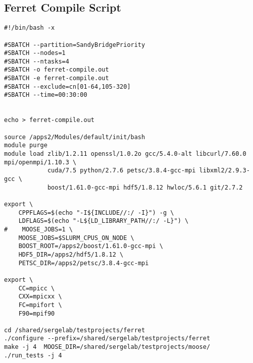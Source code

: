 \documentclass[a4paper]{article}
\begin{document}
\subsection{Ferret Compile Script}
\begin{verbatim}
#!/bin/bash -x

#SBATCH --partition=SandyBridgePriority
#SBATCH --nodes=1
#SBATCH --ntasks=4
#SBATCH -o ferret-compile.out
#SBATCH -e ferret-compile.out
#SBATCH --exclude=cn[01-64,105-320]
#SBATCH --time=00:30:00


echo > ferret-compile.out

source /apps2/Modules/default/init/bash
module purge
module load zlib/1.2.11 openssl/1.0.2o gcc/5.4.0-alt libcurl/7.60.0 mpi/openmpi/1.10.3 \
            cuda/7.5 python/2.7.6 petsc/3.8.4-gcc-mpi libxml2/2.9.3-gcc \
            boost/1.61.0-gcc-mpi hdf5/1.8.12 hwloc/5.6.1 git/2.7.2

export \
    CPPFLAGS=$(echo "-I${INCLUDE//:/ -I}") -g \
    LDFLAGS=$(echo "-L${LD_LIBRARY_PATH//:/ -L}") \
#    MOOSE_JOBS=1 \
    MOOSE_JOBS=$SLURM_CPUS_ON_NODE \
    BOOST_ROOT=/apps2/boost/1.61.0-gcc-mpi \
    HDF5_DIR=/apps2/hdf5/1.8.12 \
    PETSC_DIR=/apps2/petsc/3.8.4-gcc-mpi

export \
    CC=mpicc \
    CXX=mpicxx \
    FC=mpifort \
    F90=mpif90

cd /shared/sergelab/testprojects/ferret
./configure --prefix=/shared/sergelab/testprojects/ferret
make -j 4  MOOSE_DIR=/shared/sergelab/testprojects/moose/
./run_tests -j 4

\end{verbatim}
\newpage
\end{document}
